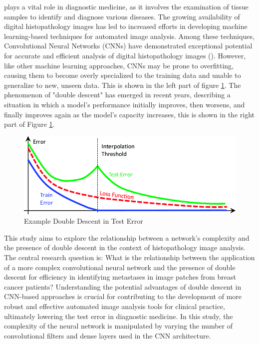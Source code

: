  plays a vital role in diagnostic medicine, as it involves the examination of tissue samples to identify and diagnose various diseases. The growing availability of digital histopathology images has led to increased efforts in developing machine learning-based techniques for automated image analysis. Among these techniques, Convolutional Neural Networks (CNNs) have demonstrated exceptional potential for accurate and efficient analysis of digital histopathology images (\cite{Wemmert2021DeepAnalysis}). However, like other machine learning approaches, CNNs may be prone to overfitting, causing them to become overly specialized to the training data and unable to generalize to new, unseen data. This is shown in the left part of figure \ref{doubledescent}. The phenomenon of "double descent" has emerged in recent years, describing a situation in which a model's performance initially improves, then worsens, and finally improves again as the model's capacity increases, this is shown in the right part of Figure \ref{doubledescent}.

\begin{figure}[!htb]
    \centering
    \begin{minipage}{0.45\textwidth}
        \includegraphics[width=\textwidth]{images/doubledescent.png}
        \caption{Example Double Descent in Test Error}
        \label{doubledescent}
    \end{minipage}
\end{figure}

This study aims to explore the relationship between a network's complexity and the presence of double descent in the context of histopathology image analysis. The central research question is: What is the relationship between the application of a more complex convolutional neural network and the presence of double descent for efficiency in identifying metastases in image patches from breast cancer patients? Understanding the potential advantages of double descent in CNN-based approaches is crucial for contributing to the development of more robust and effective automated image analysis tools for clinical practice, ultimately lowering the test error in diagnostic medicine. In this study, the complexity of the neural network is manipulated by varying the number of convolutional filters and dense layers used in the CNN architecture.


